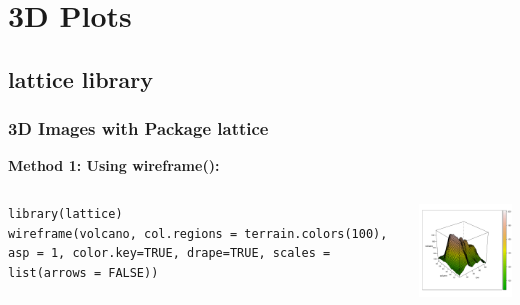 

\section{3D Plots}
\subsection{\ttfamily lattice \normalfont library}

\begin{frame}[fragile]
\frametitle{3D Images with Package \ttfamily lattice \normalfont}

\vspace{0.1in}
\bf{Method 1:} \normalfont Using \ttfamily wireframe(): \normalfont 

    \begin{columns}
\begin{lstlisting}
library(lattice)
wireframe(volcano, col.regions = terrain.colors(100), asp = 1, color.key=TRUE, drape=TRUE, scales = list(arrows = FALSE))
\end{lstlisting}

       \begin{center}
\includegraphics[width = 55mm]{images/wireframe.pdf}
\end{center}
\end{columns}
\end{frame}

